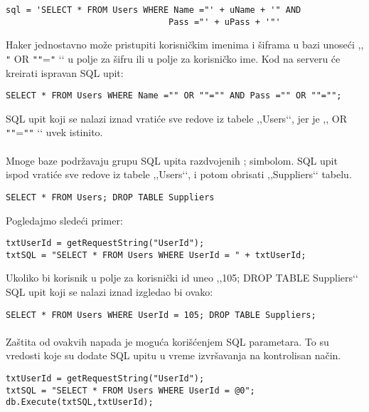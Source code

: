 \documentclass[a4paper]{article}
\begin{document}
{\begin{verbatim}
sql = 'SELECT * FROM Users WHERE Name ="' + uName + '" AND 
								Pass ="' + uPass + '"'
\end{verbatim}

\noindent Haker jednostavno može pristupiti korisničkim imenima i šiframa u bazi unoseći ,, \texttt{"} OR \texttt{"}\texttt{"}=\texttt{"} ‘‘ u polje za šifru ili u polje za korisničko ime. Kod na serveru će kreirati ispravan SQL upit:

\begin{verbatim}
SELECT * FROM Users WHERE Name ="" OR ""="" AND Pass ="" OR ""="";
\end{verbatim}

\noindent SQL upit koji se nalazi iznad vratiće sve redove iz tabele ,,Users‘‘, jer je ,, OR \texttt{"}\texttt{"}=\texttt{"}\texttt{"} ‘‘ uvek istinito. 

\paragraph{}
Mnoge baze podržavaju grupu SQL upita razdvojenih ; simbolom. SQL upit ispod vratiće sve redove iz tabele ,,Users‘‘, i potom obrisati ,,Suppliers‘‘ tabelu.

\begin{verbatim}
SELECT * FROM Users; DROP TABLE Suppliers
\end{verbatim}

\noindent Pogledajmo sledeći primer:

\begin{verbatim}
txtUserId = getRequestString("UserId");
txtSQL = "SELECT * FROM Users WHERE UserId = " + txtUserId;
\end{verbatim}

\noindent Ukoliko bi korisnik u polje za korisnički id uneo ,,105; DROP TABLE Suppliers‘‘ SQL upit koji se nalazi iznad izgledao bi ovako:

\begin{verbatim}
SELECT * FROM Users WHERE UserId = 105; DROP TABLE Suppliers; 
\end{verbatim}

\paragraph{}
Zaštita od ovakvih napada je moguća korišćenjem SQL parametara. To su vredosti koje su dodate SQL upitu u vreme izvršavanja na kontrolisan način. 

\begin{verbatim}
txtUserId = getRequestString("UserId");
txtSQL = "SELECT * FROM Users WHERE UserId = @0";
db.Execute(txtSQL,txtUserId);
\end{verbatim}

}
\end{document}
